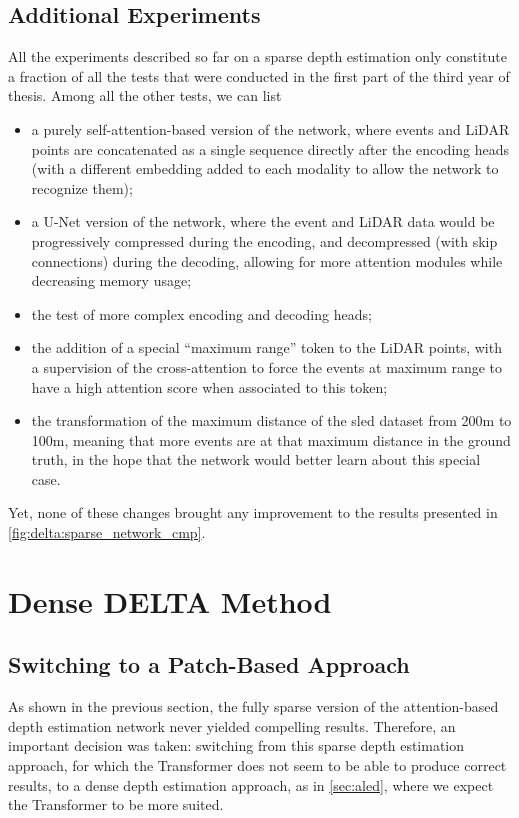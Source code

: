 \subsection{Additional Experiments}
All the experiments described so far on a sparse depth estimation only constitute a fraction of all the tests that were conducted in the first part of the third year of thesis. Among all the other tests, we can list
\begin{itemize}
  \item a purely self-attention-based version of the network, where events and LiDAR points are concatenated as a single sequence directly after the encoding heads (with a different embedding added to each modality to allow the network to recognize them);
  \item a U-Net version of the network, where the event and LiDAR data would be progressively compressed during the encoding, and decompressed (with skip connections) during the decoding, allowing for more attention modules while decreasing memory usage;
  \item the test of more complex encoding and decoding heads;
  \item the addition of a special ``maximum range'' token to the LiDAR points, with a supervision of the cross-attention to force the events at maximum range to have a high attention score when associated to this token;
  \item the transformation of the maximum distance of the \acrshort{sled} dataset from 200m to 100m, meaning that more events are at that maximum distance in the ground truth, in the hope that the network would better learn about this special case.
\end{itemize}
Yet, none of these changes brought any improvement to the results presented in \cref{fig:delta:sparse_network_cmp}.


\section{Dense DELTA Method}\label{sec:delta:method}

\subsection{Switching to a Patch-Based Approach}
As shown in the previous section, the fully sparse version of the attention-based depth estimation network never yielded compelling results. Therefore, an important decision was taken: switching from this sparse depth estimation approach, for which the Transformer does not seem to be able to produce correct results, to a dense depth estimation approach, as in \cref{sec:aled}, where we expect the Transformer to be more suited.

